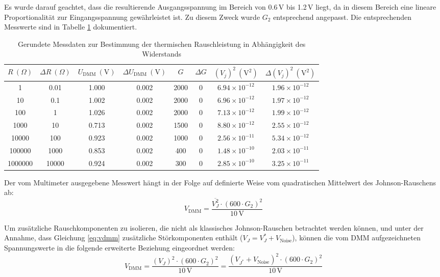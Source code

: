 Es wurde darauf geachtet, dass die resultierende Ausgangsspannung im Bereich von 0.6\,V bis 1.2\,V liegt, da in diesem Bereich eine lineare Proportionalität zur Eingangsspannung gewährleistet ist. Zu diesem Zweck wurde $G_2$ entsprechend angepasst.
Die entsprechenden Messwerte sind in Tabelle \ref{tab:johnson messdaten widerstand} dokumentiert.
\begin{table}[h!]
\centering
\begin{tabular}{|c|c|c|c|c|c|c|c|}
\hline
$R\ (\Omega)$ & $\Delta R\ (\Omega)$ & $U_{\mathrm{DMM}}\ (\mathrm{V})$ & $\Delta U_{\mathrm{DMM}}\ (\mathrm{V})$ & $G$ & $\Delta G$ & $(V_j)^2\ (\mathrm{V}^2)$ & $\Delta (V_j)^2\ (\mathrm{V}^2)$ \\
\hline
1       & 0.01     & 1.000 & 0.002 & 2000 & 0 & $6.94 \times 10^{-12}$  & $1.96 \times 10^{-12}$ \\
10      & 0.1      & 1.002 & 0.002 & 2000 & 0 & $6.96 \times 10^{-12}$  & $1.97 \times 10^{-12}$ \\
100     & 1        & 1.026 & 0.002 & 2000 & 0 & $7.13 \times 10^{-12}$  & $1.99 \times 10^{-12}$ \\
1000    & 10       & 0.713 & 0.002 & 1500 & 0 & $8.80 \times 10^{-12}$  & $2.55 \times 10^{-12}$ \\
10000   & 100      & 0.923 & 0.002 & 1000 & 0 & $2.56 \times 10^{-11}$  & $5.34 \times 10^{-12}$ \\
100000  & 1000     & 0.853 & 0.002 & 400  & 0 & $1.48 \times 10^{-10}$  & $2.03 \times 10^{-11}$ \\
1000000 & 10000    & 0.924 & 0.002 & 300  & 0 & $2.85 \times 10^{-10}$  & $3.25 \times 10^{-11}$ \\
\hline
\end{tabular}
\caption{Gerundete Messdaten zur Bestimmung der thermischen Rauschleistung in Abhängigkeit des Widerstands}
\label{tab:johnson messdaten widerstand}
\end{table}

Der vom Multimeter ausgegebene Messwert hängt in der Folge auf definierte Weise vom quadratischen Mittelwert des Johnson-Rauschens ab:
\begin{equation}
V_{\mathrm{DMM}} = \frac{\overline{V_J^2} \cdot (600 \cdot G_2)^2}{10\,\mathrm{V}}
\label{eq:vdmm}
\end{equation}

Um zusätzliche Rauschkomponenten zu isolieren, die nicht als klassisches Johnson-Rauschen betrachtet werden können, und unter der Annahme, dass Gleichung \ref{eq:vdmm} zusätzliche Störkomponenten enthält ($V_J = V_J^* + V_{\text{Noise}}$), können die vom DMM aufgezeichneten Spannungswerte in die folgende erweiterte Beziehung eingeordnet werden:
\begin{equation}
V_{\mathrm{DMM}} = \frac{(V_J)^2 \cdot (600 \cdot G_2)^2}{10\,\mathrm{V}} = \frac{(V_{J^*} + V_{\mathrm{Noise}})^2 \cdot (600 \cdot G_2)^2}{10\,\mathrm{V}}
\end{equation}

